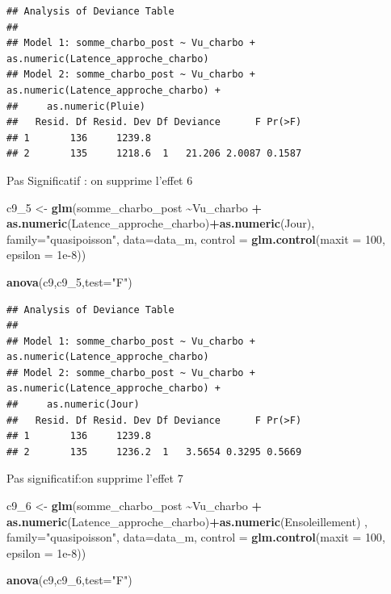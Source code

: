 \documentclass[
  french,
]{article}
\newenvironment{Shaded}{\begin{snugshade}}{\end{snugshade}}
\newcommand{\AttributeTok}[1]{\textcolor[rgb]{0.13,0.29,0.53}{#1}}
\newcommand{\DecValTok}[1]{\textcolor[rgb]{0.00,0.00,0.81}{#1}}
\newcommand{\FloatTok}[1]{\textcolor[rgb]{0.00,0.00,0.81}{#1}}
\newcommand{\FunctionTok}[1]{\textcolor[rgb]{0.13,0.29,0.53}{\textbf{#1}}}
\newcommand{\NormalTok}[1]{#1}
\newcommand{\OtherTok}[1]{\textcolor[rgb]{0.56,0.35,0.01}{#1}}
\newcommand{\SpecialCharTok}[1]{\textcolor[rgb]{0.81,0.36,0.00}{\textbf{#1}}}
\newcommand{\StringTok}[1]{\textcolor[rgb]{0.31,0.60,0.02}{#1}}
\begin{document}
\begin{verbatim}
## Analysis of Deviance Table
## 
## Model 1: somme_charbo_post ~ Vu_charbo + as.numeric(Latence_approche_charbo)
## Model 2: somme_charbo_post ~ Vu_charbo + as.numeric(Latence_approche_charbo) + 
##     as.numeric(Pluie)
##   Resid. Df Resid. Dev Df Deviance      F Pr(>F)
## 1       136     1239.8                          
## 2       135     1218.6  1   21.206 2.0087 0.1587
\end{verbatim}

Pas Significatif : on supprime l'effet 6

\begin{Shaded}
\begin{Highlighting}[]
\NormalTok{c9\_5 }\OtherTok{\textless{}{-}} \FunctionTok{glm}\NormalTok{(somme\_charbo\_post }\SpecialCharTok{\textasciitilde{}}\NormalTok{Vu\_charbo }\SpecialCharTok{+} \FunctionTok{as.numeric}\NormalTok{(Latence\_approche\_charbo)}\SpecialCharTok{+}\FunctionTok{as.numeric}\NormalTok{(Jour), }\AttributeTok{family=}\StringTok{"quasipoisson"}\NormalTok{, }\AttributeTok{data=}\NormalTok{data\_m, }
            \AttributeTok{control =} \FunctionTok{glm.control}\NormalTok{(}\AttributeTok{maxit =} \DecValTok{100}\NormalTok{, }\AttributeTok{epsilon =} \FloatTok{1e{-}8}\NormalTok{))}

\FunctionTok{anova}\NormalTok{(c9,c9\_5,}\AttributeTok{test=}\StringTok{"F"}\NormalTok{)}
\end{Highlighting}
\end{Shaded}

\begin{verbatim}
## Analysis of Deviance Table
## 
## Model 1: somme_charbo_post ~ Vu_charbo + as.numeric(Latence_approche_charbo)
## Model 2: somme_charbo_post ~ Vu_charbo + as.numeric(Latence_approche_charbo) + 
##     as.numeric(Jour)
##   Resid. Df Resid. Dev Df Deviance      F Pr(>F)
## 1       136     1239.8                          
## 2       135     1236.2  1   3.5654 0.3295 0.5669
\end{verbatim}

Pas significatif:on supprime l'effet 7

\begin{Shaded}
\begin{Highlighting}[]
\NormalTok{c9\_6 }\OtherTok{\textless{}{-}} \FunctionTok{glm}\NormalTok{(somme\_charbo\_post }\SpecialCharTok{\textasciitilde{}}\NormalTok{Vu\_charbo }\SpecialCharTok{+} \FunctionTok{as.numeric}\NormalTok{(Latence\_approche\_charbo)}\SpecialCharTok{+}\FunctionTok{as.numeric}\NormalTok{(Ensoleillement) , }\AttributeTok{family=}\StringTok{"quasipoisson"}\NormalTok{, }\AttributeTok{data=}\NormalTok{data\_m, }
            \AttributeTok{control =} \FunctionTok{glm.control}\NormalTok{(}\AttributeTok{maxit =} \DecValTok{100}\NormalTok{, }\AttributeTok{epsilon =} \FloatTok{1e{-}8}\NormalTok{))}

\FunctionTok{anova}\NormalTok{(c9,c9\_6,}\AttributeTok{test=}\StringTok{"F"}\NormalTok{)}
\end{Highlighting}
\end{Shaded}
\end{document}
